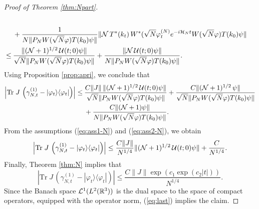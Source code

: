 \documentclass[11pt,a4paper]{article}
\newcommand{\cU}{{\cal U}}
\newcommand{\bR}{{\mathbb R}}
\newcommand{\tr}{\mbox{Tr}}
\newcommand{\cH}{{\cal H}}
\newcommand{\cL}{{\cal L}}
\newcommand{\cN}{{\cal N}}
\begin{document}
\begin{proof}[Proof of Theorem \ref{thm:Npart}]
\[\begin{split}
\\ &+  \frac{1}{N \| P_N W(\sqrt{N} \varphi) T(k_0) \psi \|} \| \cN \, T^* (k_t) \, W^* (\sqrt{N} \varphi_t^{(N)}  e^{-i\cH_N t}  W(\sqrt{N} \varphi) T(k_0) \psi \|  \\ \leq \:& \frac{ \| (\cN+1)^{1/2} \, \cU (t;0) \psi \|}{\sqrt{N} \| P_N W(\sqrt{N} \varphi) T(k_0) \psi \|}  + \frac{ \| \cN \, \cU (t;0) \psi \| 
}{N \|  P_N W(\sqrt{N} \varphi) T(k_0) \psi \|}.  \end{split} \]
Using Proposition \ref{prop:apri}, we conclude that
\[  \begin{split}
\left| \tr \; J \, \left( \gamma^{(1)}_{N,t} - |\varphi_t \rangle\langle \varphi_t| \right)  \right|  \leq \:& \frac{C\| J \| \, \| (\cN+1)^{1/2} \, \cU (t;0) \psi \|}{\sqrt{N} \| P_N W(\sqrt{N} \varphi) T(k_0) \psi \|}   + 
\frac{C \| (\cN+1)^{1/2} \, \psi \|  }{\sqrt{N} \|  P_N W(\sqrt{N} \varphi) T(k_0) \psi \|}  
\\ &+ \frac{C \| (\cN+1) \psi \| }{N \| P_N W(\sqrt{N} \varphi) T(k_0) \psi \|}.  \end{split}
\]
{F}rom the assumptions (\ref{eq:ass1-N}) and (\ref{eq:ass2-N}), we obtain
\[ \left| \tr \; J \, \left( \gamma^{(1)}_{N,t} - |\varphi_t \rangle\langle \varphi_t| \right)  \right| \leq \frac{C\| J \|}{N^{1/4}} \| (\cN+1)^{1/2} \, \cU (t;0) \psi \| + \frac{C}{N^{1/4}}. \]
Finally, Theorem \ref{thm:N} implies that
\begin{equation}\label{eq:last} \left| \tr \; J \, \left( \gamma^{(1)}_{N,t} - |\varphi_t \rangle\langle \varphi_t| \right)  \right| \leq \frac{C\| J \| \exp \left(c_1 \exp (c_2 |t|) \right)}{N^{1/4}}. \end{equation}
Since the Banach space $\cL^1 (L^2 (\bR^3))$ is the dual space to the space of compact operators, equipped with the operator norm, (\ref{eq:last}) implies the claim. 
\end{proof}
\end{document}
